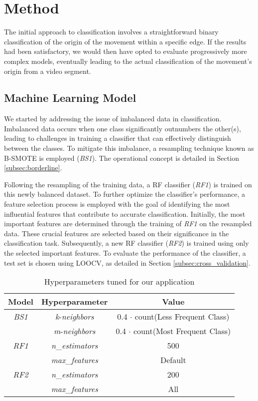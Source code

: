 \chapter{Method}

The initial approach to classification involves a straightforward binary classification of the origin of the movement within a specific edge.
If the results had been satisfactory, we would then have opted to evaluate progressively more complex models, eventually leading to the actual classification of the movement's origin from a video segment.

\section{Machine Learning Model}
We started by addressing the issue of imbalanced data in classification. Imbalanced data occurs when one class significantly outnumbers the other(s), leading to challenges in training a classifier that can effectively distinguish between the classes.
To mitigate this imbalance, a resampling technique known as B-SMOTE is employed (\textit{BS1}). The operational concept is detailed in Section \ref{subsec:borderline}.

Following the resampling of the training data, a RF classifier (\textit{RF1}) is trained on this newly balanced dataset.
To further optimize the classifier's performance, a feature selection process is employed with the goal of identifying the most influential features that contribute to accurate classification.
Initially, the most important features are determined through the training of \textit{RF1} on the resampled data. 
These crucial features are selected based on their significance in the classification task. 
Subsequently, a new RF classifier (\textit{RF2}) is trained using only the selected important features. 
To evaluate the performance of the classifier, a test set is chosen using LOOCV, as detailed in Section \ref{subsec:cross_validation}. 

\begin{table}[H]
    \centering
    \begin{tabular}{|c|c|c|}
    \hline
    \textbf{Model} & \textbf{Hyperparameter} & \textbf{Value} \\
    \hline
    \textit{BS1} & \textit{k}-\textit{neighbors} & 0.4 $\cdot$ count(Less Frequent Class)  \\
    & \textit{m}-\textit{neighbors} & 0.4 $\cdot$ count(Most Frequent Class)  \\
    \hline
    \textit{RF1} & \textit{n}\_\textit{estimators} & 500  \\
    & \textit{max}\_\textit{features} & Default  \\
    \hline
    \textit{RF2} & \textit{n}\_\textit{estimators} & 200  \\
    & \textit{max}\_\textit{features} & All  \\
    \hline
    \end{tabular}
    \caption{Hyperparameters tuned for our application}
    \label{tab:ml_param}
\end{table}

